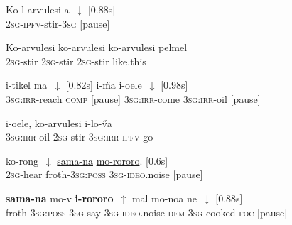 \documentclass[output=paper]{LSP/langsci}
\begin{document}
  \begin{exe}
\ex \label{Guapp19}
\gll  Ko-l-arvulesi-a~$\downarrow$  [0.88s]  \\     	       
\textsc{2sg-ipfv}-stir-\textsc{3sg} [pause]\\
\glt {} 
\end{exe}

  \begin{exe}
\ex \label{Guapp20}
\gll  Ko-arvulesi    ko-arvulesi ko-arvulesi   pelmel   \\     	       
\textsc{2sg}-stir \textsc{2sg}-stir \textsc{2sg}-stir like.this \\
\glt {} 
\end{exe}

  \begin{exe}
\ex \label{Guapp21}
\gll   i-tikel            ma~$\downarrow$     [0.82s]          i-\H{m}a           i-oele~$\downarrow$ [0.98s]    \\     	       
 \textsc{3sg:irr}-reach     \textsc{comp}    [pause]   \textsc{3sg:irr}-come  \textsc{3sg:irr}-oil [pause]\\
\glt {} 
\end{exe}

  \begin{exe}
\ex \label{Guapp22}
\gll    i-oele, ko-arvulesi i-lo-\H{v}a \\     	       
  \textsc{3sg:irr}-oil \textsc{2sg}-stir  \textsc{3sg:irr-ipfv}-go\\
\glt {} 
\end{exe}

  \begin{exe}
\ex \label{Guapp23}
\gll   ko-rong~$\downarrow$    \underline{sama-na}               \underline{mo-rororo}.     [0.6s]        \\     	       
 \textsc{2sg}-hear  froth-\textsc{3sg:poss}     \textsc{3sg}-\textsc{ideo}.noise [pause]\\
\glt {} 
\end{exe}

  \begin{exe}
\ex \label{Guapp24}
\gll     \textbf{sama-na}   mo-v            \textbf{i-rororo}~$\uparrow$    mal  mo-noa         ne~$\downarrow$   [0.88s]   \\     	       
 froth-\textsc{3sg:poss}  \textsc{3sg}-say   \textsc{3sg}-\textsc{ideo}.noise \textsc{dem}  \textsc{3sg}-cooked   \textsc{foc} [pause] \\
\glt {} 
\end{exe}
\end{document}
